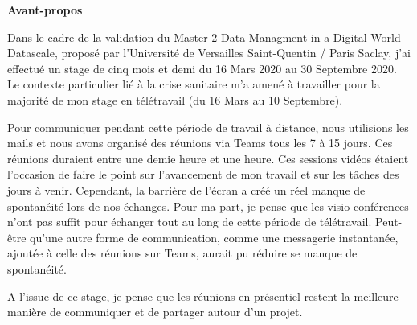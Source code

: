 \documentclass{article}
\begin{document}
\vfill
\begin{center}
	\textbf{Avant-propos}
\end{center}
\hspace*{0.4cm}
Dans le cadre de la validation du Master 2 Data Managment in a Digital World - Datascale, proposé par l'Université de Versailles Saint-Quentin / Paris Saclay, j'ai effectué un stage de cinq mois et demi du 16 Mars 2020 au 30 Septembre 2020.
Le contexte particulier lié à la crise sanitaire m'a amené à travailler pour la majorité de mon stage en télétravail (du 16 Mars au 10 Septembre).\par
Pour communiquer pendant cette période de travail à distance, nous utilisions les mails et nous avons organisé des réunions via Teams tous les 7 à 15 jours.
Ces réunions duraient entre une demie heure et une heure.
Ces sessions vidéos étaient l'occasion de faire le point sur l'avancement de mon travail et sur les tâches des jours à venir.
Cependant, la barrière de l'écran a créé un réel manque de spontanéité lors de nos échanges.
Pour ma part, je pense que les visio-conférences n'ont pas suffit pour échanger tout au long de cette période de télétravail. 
Peut-être qu'une autre forme de communication, comme une messagerie instantanée, ajoutée à celle des réunions sur Teams, aurait pu réduire se manque de spontanéité.\par
A l'issue de ce stage, je pense que les réunions en présentiel restent la meilleure manière de communiquer et de partager autour d'un projet.

\newpage
\renewcommand{\contentsname}{Table des matières}\tableofcontents

\newpage
\end{document}
